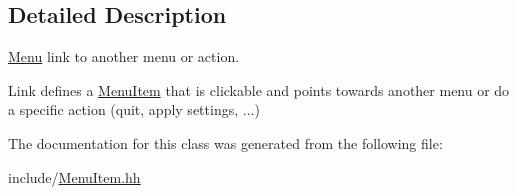 \subsection{Detailed Description}
\hyperlink{classMenu}{Menu} link to another menu or action. 

Link defines a \hyperlink{classMenuItem}{Menu\+Item} that is clickable and points towards another menu or do a specific action (quit, apply settings, ...) 

The documentation for this class was generated from the following file\+:\begin{DoxyCompactItemize}
\item 
include/\hyperlink{MenuItem_8hh}{Menu\+Item.\+hh}\end{DoxyCompactItemize}
